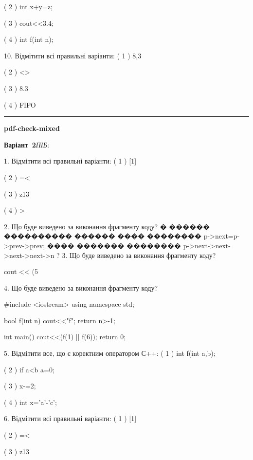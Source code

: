 \documentclass[11pt]{article}
\begin{document}
( 2 ) int x+y=z;

( 3 ) cout<<3.4;

( 4 ) int f(int n);

10. Відмітити всі правильні варіанти:
( 1 ) 8,3

( 2 ) <>

( 3 ) 8.3

( 4 ) FIFO











\vspace{10mm}
\noindent\rule{\textwidth}{0.3pt}
\vspace{8mm}
{\large\textbf{pdf-check-mixed}}

\textbf{Варіант \No\,2}\hfill \textit{ПІБ:}\,\underline{\hspace{60mm}}
\vspace{4mm}

1. Відмітити всі правильні варіанти:
( 1 ) [1]

( 2 ) =<

( 3 ) z13

( 4 ) >

2. Що буде виведено за виконання фрагменту коду?
� ������ ���������� ������ ���� �������� p->next=p->prev->prev;
���� ������� �������� p->next->next->next->next->n ?
3. Що буде виведено за виконання фрагменту коду?

cout << (5 %

4. Що буде виведено за виконання фрагменту коду?

#include <iostream>
using namespace std;

bool f(int n){
    cout<<"f";
    return n>-1;
}

int main(){
    cout<<(f(1) || f(6));
    return 0;
}

5. Відмітити все, що є коректним оператором С++:
( 1 ) int f(int a,b);

( 2 ) if a<b a=0;

( 3 ) x-=2;

( 4 ) int x='a'-'c';

6. Відмітити всі правильні варіанти:
( 1 ) [1]

( 2 ) =<

( 3 ) z13
\end{document}
